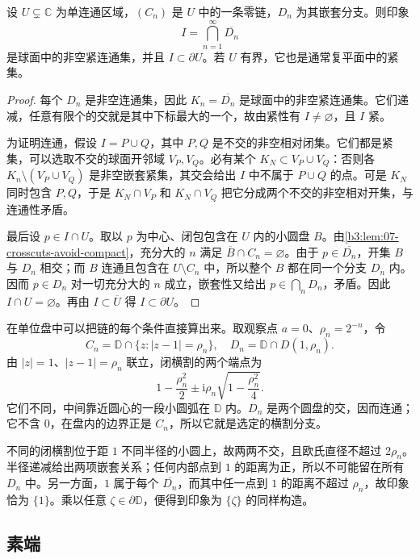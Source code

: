 \begin{proposition}\label{b3:prop:07-impression-continuum}
设 \(U\subsetneq\mathbb C\) 为单连通区域，\((C_n)\) 是 \(U\) 中的一条零链，\(D_n\) 为其嵌套分支。则印象
\[
 I=\bigcap_{n=1}^{\infty}\overline{D_n}
\]
是球面中的非空紧连通集，并且 \(I\subset\partial U\)。若 \(U\) 有界，它也是通常复平面中的紧集。
\end{proposition}
\begin{proof}
每个 \(D_n\) 是非空连通集，因此 \(K_n=\overline{D_n}\) 是球面中的非空紧连通集。它们递减，任意有限个的交就是其中下标最大的一个，故由紧性有 \(I\ne\varnothing\)，且 \(I\) 紧。

为证明连通，假设 \(I=P\cup Q\)，其中 \(P,Q\) 是不交的非空相对闭集。它们都是紧集，可以选取不交的球面开邻域 \(V_P,V_Q\)。必有某个 \(K_N\subset V_P\cup V_Q\)：否则各 \(K_n\setminus(V_P\cup V_Q)\) 是非空嵌套紧集，其交会给出 \(I\) 中不属于 \(P\cup Q\) 的点。可是 \(K_N\) 同时包含 \(P,Q\)，于是 \(K_N\cap V_P\) 和 \(K_N\cap V_Q\) 把它分成两个不交的非空相对开集，与连通性矛盾。

最后设 \(p\in I\cap U\)。取以 \(p\) 为中心、闭包包含在 \(U\) 内的小圆盘 \(B\)。由\cref{b3:lem:07-crosscuts-avoid-compact}，充分大的 \(n\) 满足 \(\overline B\cap C_n=\varnothing\)。由于 \(p\in\overline{D_n}\)，开集 \(B\) 与 \(D_n\) 相交；而 \(B\) 连通且包含在 \(U\setminus C_n\) 中，所以整个 \(B\) 都在同一个分支 \(D_n\) 内。因而 \(p\in D_n\) 对一切充分大的 \(n\) 成立，嵌套性又给出 \(p\in\bigcap_nD_n\)，矛盾。因此 \(I\cap U=\varnothing\)。再由 \(I\subset\overline U\) 得 \(I\subset\partial U\)。
\end{proof}
在单位盘中可以把链的每个条件直接算出来。取观察点 \(a=0\)、\(\rho_n=2^{-n}\)，令
\[
 C_n=\mathbb D\cap\{z:|z-1|=\rho_n\},
 \quad D_n=\mathbb D\cap D(1,\rho_n).
\]
由 \(|z|=1\)、\(|z-1|=\rho_n\) 联立，闭横割的两个端点为
\[
 1-\frac{\rho_n^2}{2}
 \pm\mathrm i\rho_n\sqrt{1-\frac{\rho_n^2}{4}}.
\]
它们不同，中间靠近圆心的一段小圆弧在 \(\mathbb D\) 内。\(D_n\) 是两个圆盘的交，因而连通；它不含 \(0\)，在盘内的边界正是 \(C_n\)，所以它就是选定的横割分支。

\ProseParagraphBreak
不同的闭横割位于距 \(1\) 不同半径的小圆上，故两两不交，且欧氏直径不超过 \(2\rho_n\)。半径递减给出两项嵌套关系；任何内部点到 \(1\) 的距离为正，所以不可能留在所有 \(D_n\) 中。另一方面，\(1\) 属于每个 \(\overline{D_n}\)，而其中任一点到 \(1\) 的距离不超过 \(\rho_n\)，故印象恰为 \(\{1\}\)。乘以任意 \(\zeta\in\partial\mathbb D\)，便得到印象为 \(\{\zeta\}\) 的同样构造。

\subsection{素端}
\label{b3:subsec:070103}

